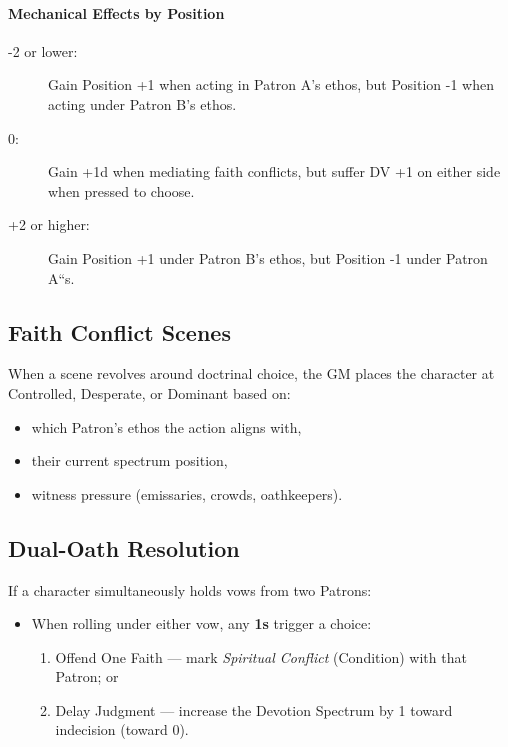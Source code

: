 \documentclass[11pt]{article}
\begin{document}
\paragraph*{Mechanical Effects by Position}
\begin{description}
  \item[-2 or lower:] Gain Position +1 when acting in Patron A's ethos,
  but Position -1 when acting under Patron B's ethos.
  \item[0:] Gain +1d when mediating faith conflicts, but suffer DV +1 on
  either side when pressed to choose.
  \item[+2 or higher:] Gain Position +1 under Patron B's ethos, but
  Position -1 under Patron A``s.
\end{description}

\subsection{Faith Conflict Scenes}

When a scene revolves around doctrinal choice, the GM places the
character at Controlled, Desperate, or Dominant based on:

\begin{itemize}
  \item which Patron's ethos the action aligns with,
  \item their current spectrum position,
  \item witness pressure (emissaries, crowds, oathkeepers).
\end{itemize}

\subsection{Dual-Oath Resolution}

If a character simultaneously holds vows from two Patrons:

\begin{itemize}
  \item When rolling under either vow, any \textbf{1s} trigger a choice:
  \begin{enumerate}
    \item Offend One Faith --- mark \emph{Spiritual Conflict} (Condition)
    with that Patron; or
    \item Delay Judgment --- increase the Devotion Spectrum by 1 toward
    indecision (toward 0).
  \end{enumerate}
\end{itemize}
\end{document}
